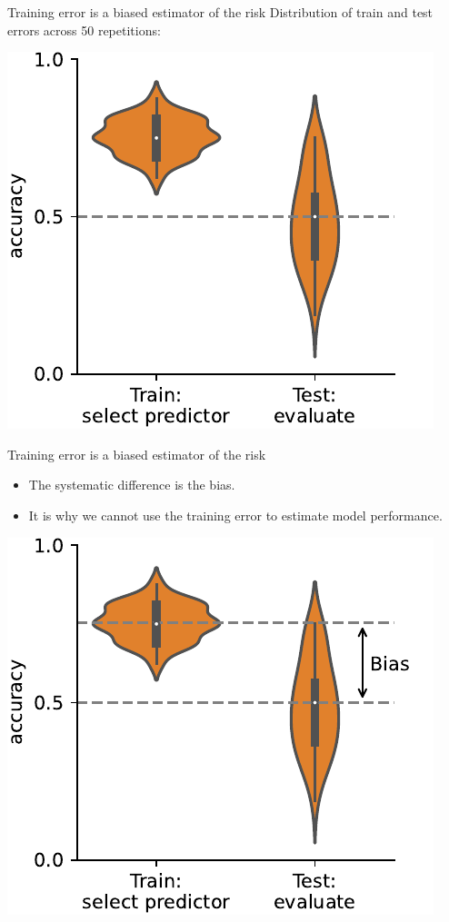 \documentclass[presentation,mathserif,table]{beamer}
\begin{document}
\begin{frame}[label={sec:orgbba9e29}]{Training error is a biased estimator of the risk}
Distribution of train and test errors across 50 repetitions:
\begin{center}
\includegraphics[height=.5 \textheight]{figures/generated/select_evaluate_averaged/select_evaluate_averaged_1.pdf}
\end{center}
\end{frame}
\begin{frame}[label={sec:orgcb63a66}]{Training error is a biased estimator of the risk}
\begin{itemize}
\item The systematic difference is the bias.
\item It is why we cannot use the training error to estimate model performance.
\end{itemize}
\begin{center}
\includegraphics[height=.5 \textheight]{figures/generated/select_evaluate_averaged/select_evaluate_averaged_2.pdf}
\end{center}
\end{frame}
\end{document}
